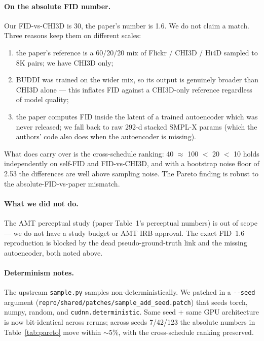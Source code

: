 \documentclass[10pt]{article}
\begin{document}
\paragraph{On the absolute FID number.}
\label{sec:task1-caveats}
Our FID-vs-CHI3D is 30, the paper's number is 1.6. We do not claim a match. Three reasons keep them on different scales:

\begin{enumerate}
    \item the paper's reference is a 60/20/20 mix of Flickr / CHI3D / Hi4D sampled to 8K pairs; we have CHI3D only;
    \item BUDDI was trained on the wider mix, so its output is genuinely broader than CHI3D alone --- this inflates FID against a CHI3D-only reference regardless of model quality;
    \item the paper computes FID inside the latent of a trained autoencoder which was never released; we fall back to raw 292-d stacked SMPL-X params (which the authors' code also does when the autoencoder is missing).
\end{enumerate}

What does carry over is the cross-schedule ranking: 40 $\approx$ 100 $<$ 20 $<$ 10 holds independently on self-FID and FID-vs-CHI3D, and with a bootstrap noise floor of 2.53 the differences are well above sampling noise. The Pareto finding is robust to the absolute-FID-vs-paper mismatch.

\paragraph{What we did not do.}
The AMT perceptual study (paper Table~1's perceptual numbers) is out of scope --- we do not have a study budget or AMT IRB approval. The exact FID~1.6 reproduction is blocked by the dead pseudo-ground-truth link and the missing autoencoder, both noted above.

\paragraph{Determinism notes.}
The upstream \texttt{sample.py} samples non-deterministically. We patched in a \texttt{-{}-seed} argument (\texttt{repro/shared/patches/sample\_add\_seed.patch}) that seeds torch, numpy, random, and \texttt{cudnn.deterministic}. Same seed + same GPU architecture is now bit-identical across reruns; across seeds 7/42/123 the absolute numbers in Table~\ref{tab:pareto} move within $\sim$5\%, with the cross-schedule ranking preserved.
\end{document}
